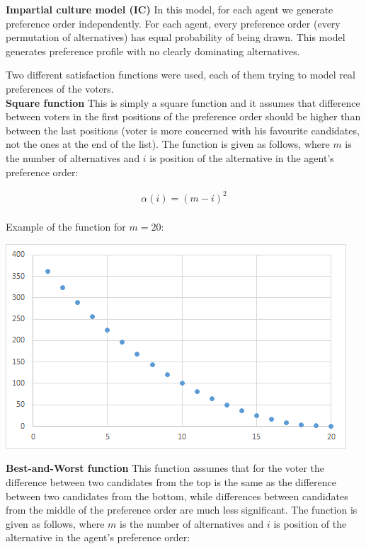 \noindent
\textbf{Impartial culture model (IC)} \hspace{.1in} In this model, for each agent we generate preference order independently. For each agent, every preference order (every permutation of alternatives) has equal probability of being drawn. This model generates preference profile with no clearly dominating alternatives.
\\
\vspace{16pt}

Two different satisfaction functions were used, each of them trying to model real preferences of the voters.
\\

\noindent
\textbf{Square function} \hspace{.1in} This is simply a square function and it assumes that difference between voters in the first positions of the preference order should be higher than between the last positions (voter is more concerned with his favourite candidates, not the ones at the end of the list). The function is given as follows, where $m$ is the number of alternatives and $i$ is position of the alternative in the agent's preference order:

\begin{gather}
	\alpha(i) = (m - i)^{2}
\end{gather}
\\

Example of the function for $m = 20$:

\begin{center}
	\includegraphics[scale=0.75]{satfun1}
\end{center}

\newpage

\noindent
\textbf{Best-and-Worst function} \hspace{.1in} This function assumes that for the voter the difference between two candidates from the top is the same as the difference between two candidates from the bottom, while differences between candidates from the middle of the preference order are much less significant. The function is given as follows, where $m$ is the number of alternatives and $i$ is position of the alternative in the agent's preference order:

